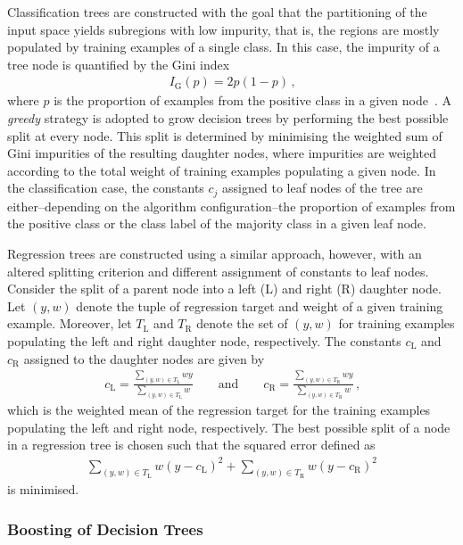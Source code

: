 Classification trees are constructed with the goal that the partitioning of the
input space yields subregions with low impurity, that is, the regions are mostly
populated by training examples of a single class. In this case, the impurity of
a tree node is quantified by the Gini index
\begin{align*}
  I_{\text{G}}(p) = 2 p (1 - p) \,\text{,}
\end{align*}
where $p$ is the proportion of examples from the positive class in a given
node~\cite{hastie09}. A \emph{greedy} strategy is adopted to grow decision trees
by performing the best possible split at every node. This split is determined by
minimising the weighted sum of Gini impurities of the resulting daughter nodes,
where impurities are weighted according to the total weight of training examples
populating a given node. In the classification case, the constants $c_j$
assigned to leaf nodes of the tree are either--depending on the algorithm
configuration--the proportion of examples from the positive class or the class
label of the majority class in a given leaf node.

Regression trees are constructed using a similar approach, however, with an
altered splitting criterion and different assignment of constants to leaf
nodes. Consider the split of a parent node into a left (L) and right (R)
daughter node. Let $(y, w)$ denote the tuple of regression target and weight of
a given training example. Moreover, let $T_{\text{L}}$ and $T_{\text{R}}$ denote
the set of $(y, w)$ for training examples populating the left and right daughter
node, respectively. The constants $c_{\text{L}}$ and $c_{\text{R}}$ assigned to
the daughter nodes are given by
\begin{align*}
  c_{\text{L}} = \frac{\sum_{(y, w) \in T_{\text{L}}} w y}{\sum_{(y, w) \in T_{\text{L}}} w} \qquad \text{and} \qquad c_{\text{R}} = \frac{\sum_{(y, w) \in T_{\text{R}}} w y}{\sum_{(y, w) \in T_{\text{R}}} w} \,\text{,}
\end{align*}
which is the weighted mean of the regression target for the training examples
populating the left and right node, respectively. The best possible split of a
node in a regression tree is chosen such that the squared error defined as
\begin{align*}
  \sum_{(y, w) \in T_{\text{L}}} w (y - c_{\text{L}})^2 + \sum_{(y, w) \in T_{\text{R}} } w (y - c_{\text{R}})^2
\end{align*}
is minimised.


\subsubsection{Boosting of Decision Trees}

